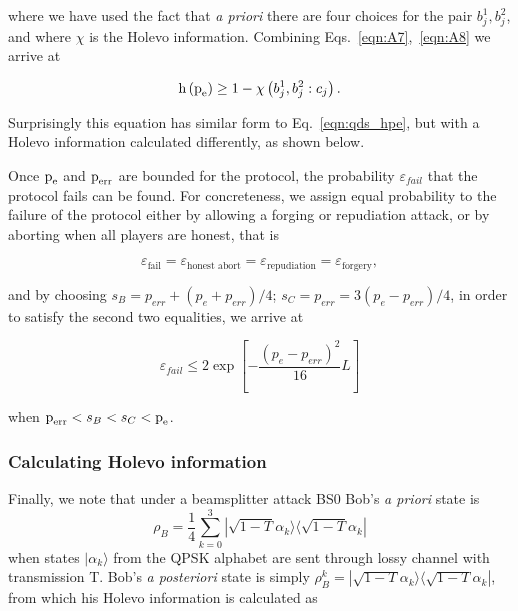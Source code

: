 \noindent where we have used the fact that \emph{a priori} there are four choices for the pair $b_j^1, b_j^2$, and where $\chi$ is the Holevo information. Combining Eqs.~\ref{eqn:A7},~\ref{eqn:A8} we arrive at

\begin{equation}
\text{h}\left(\text{p}_{\text{e}}\right) \ge 1 - \chi\left(b_j^1, b_j^2 : c_j\right).
\end{equation}

\noindent Surprisingly this equation has similar form to Eq.~\ref{eqn:qds_hpe}, but with a Holevo information calculated differently, as shown below. %


Once $\text{p}_{\text{e}}$ and $\text{p}_{\text{err}}$ are bounded for the protocol, the probability $\varepsilon_{fail}$ that the protocol fails can be found. For concreteness, we assign equal probability to the failure of the protocol either by allowing a forging or repudiation attack, or by aborting when all players are honest, that is

\begin{equation*}
\varepsilon_{\text{fail}} = \varepsilon_{\text{honest abort}} = \varepsilon_{\text{repudiation}} = \varepsilon_{\text{forgery}},
\end{equation*}

\noindent and by choosing $s_B = p_{err} + \left(p_e + p_{err}\right)/4$; $s_C = p_{err} = 3\left(p_e - p_{err}\right)/4$, in order to satisfy the second two equalities, we arrive at 

\begin{equation}\label{eqn:aqc_qdsb_efail}
\varepsilon_{fail} \le 2 \exp \left[ - \frac{\left( p_e - p_{err} \right)^2}{16} L \right]
\end{equation}

\noindent when $\text{p}_{\text{err}}< s_B < s_C < \text{p}_{\text{e}}$.

\subsubsection{Calculating Holevo information}

Finally, we note that under a beamsplitter attack BS$0$ Bob's \emph{a priori} state is
\begin{equation}\label{eqn:qdsb_apriori_state}
\rho_B = \frac{1}{4}\sum_{k=0}^3 |\sqrt{1-T}\alpha_k\rangle\langle\sqrt{1-T}\alpha_k|
\end{equation}
when states $|\alpha_k\rangle$ from the QPSK alphabet are sent through lossy channel with transmission T. Bob's \emph{a posteriori} state is simply $\rho_{B}^k = |\sqrt{1-T}\alpha_k\rangle\langle \sqrt{1-T}\alpha_k|$, from which his Holevo information is calculated as

